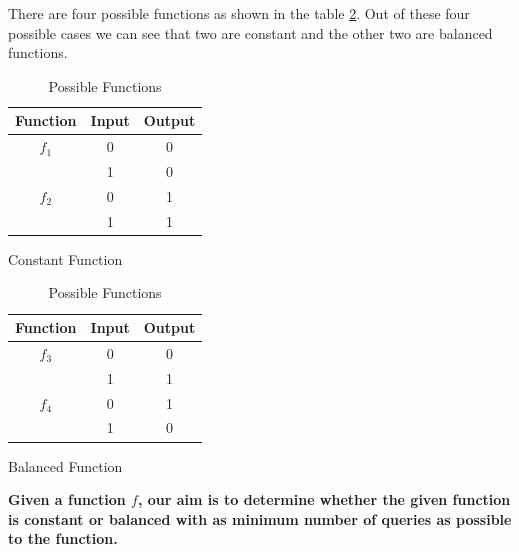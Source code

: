 \documentclass[12pt, oneside]{book}
\theoremstyle{definition}
\theoremstyle{definition}
\theoremstyle{remark}
\begin{document}
There are four possible functions as shown in the table \ref{tab:Deutsch}. Out of these four possible cases we can see that two are constant and the other two are balanced functions.

\begin{table}[H]
    \centering
     \begin{subtable}[b]{0.45\linewidth}
        \centering
          \begin{tabular}{|c|c|c|}
            \hline
             Function & Input & Output \\
            \hline
              $f_1$& 0 & 0 \\
              & 1 & 0 \\
             \hline
               $f_2$& 0 & 1 \\
               & 1 & 1 \\
              \hline
           \end{tabular}
           \caption{Constant Function}
        \end{subtable}%
     \begin{subtable}[b]{0.45\linewidth}
            \centering
            \begin{tabular}{|c|c|c|}
                \hline
                Function & Input & Output \\
                \hline
                $f_3$& 0 & 0 \\
                & 1 & 1 \\
                \hline
                $f_4$& 0 & 1 \\
                & 1 & 0 \\
                \hline
            \end{tabular}
            \caption{Balanced Function}
        \end{subtable}
        \caption{Possible Functions}
        \label{tab:Deutsch}
\end{table}

\textbf{Given a function $f$, our aim is to determine whether the given function is constant or balanced with as minimum number of queries as possible to the function.}
\end{document}
